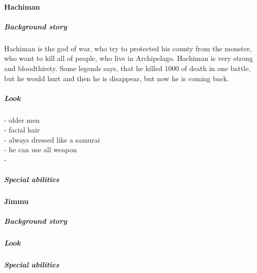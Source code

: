 \documentclass[parskip=full]{scrartcl}
\begin{document}
					\paragraph{Hachiman}\vspace{-0.5cm}
						\subparagraph{Background story} \vspace{-0.5cm}
							\par \begingroup
							\leftskip=2cm
							\noindent
									Hachiman is the god of war, who try to protected his county from the monster, who want to kill all of people, who live in Archipelago. Hachiman is very strong and bloodthirsty. Some legends says, that he killed 1000 of death in one battle, but he would hurt and then he is disappear, but now he is coming back. 
							\par \endgroup
						\subparagraph{Look} \vspace{-0.5cm}
							\par \begingroup
							\leftskip=2cm
							\noindent
									- older men \\
									- facial hair \\
									- always dressed like a samurai \\
									- he can use all weapon \\
									- 
							\par \endgroup
						\subparagraph{Special abilities} \vspace{-0.5cm}
							\par \begingroup
							\leftskip=2cm
							\noindent
							
							\par \endgroup
					\paragraph{Jimmu}\vspace{-0.5cm}
						\subparagraph{Background story} \vspace{-0.5cm}
							\par \begingroup
							\leftskip=2cm
							\noindent
							
							\par \endgroup
						\subparagraph{Look} \vspace{-0.5cm}
							\par \begingroup
							\leftskip=2cm
							\noindent
							
							\par \endgroup
						\subparagraph{Special abilities} \vspace{-0.5cm}
							\par \begingroup
							\leftskip=2cm
							\noindent
							
\end{document}
